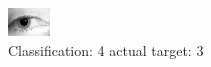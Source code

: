 \begin{figure}[h!]
\begin{center}
\includegraphics[width=0.60\columnwidth]{figures/ID1307_class_4_target_3.png}
\end{center}
\caption{ Classification: 4 actual target: 3}
\label{fig:ID1307_class_4_target_3}
\end{figure}
